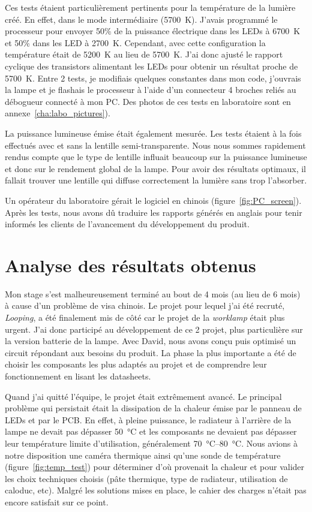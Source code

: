 \documentclass[a4paper, 12pt, sffamily]{report}
\begin{document}
Ces tests étaient particulièrement pertinents pour la température de la lumière créé. En effet, dans le mode intermédiaire (\SI{5700}{\kelvin}). J'avais programmé le processeur pour envoyer 50\% de la puissance électrique dans les LEDs à \SI{6700}{\kelvin} et 50\% dans les LED à \SI{2700}{\kelvin}. Cependant, avec cette configuration la température était de \SI{5200}{\kelvin} au lieu de \SI{5700}{\kelvin}. J'ai donc ajusté le rapport cyclique des transistors alimentant les LEDs pour obtenir un résultat proche de \SI{5700}{\kelvin}. Entre 2 tests, je modifiais quelques constantes dans mon code, j'ouvrais la lampe et je flashais le processeur à l'aide d'un connecteur 4 broches reliés au débogueur connecté à mon PC. Des photos de ces tests en laboratoire sont en annexe~\ref{cha:labo_pictures}).

La puissance lumineuse émise était également mesurée. Les tests étaient à la fois effectués avec et sans la lentille semi-transparente. Nous nous sommes rapidement rendus compte que le type de lentille influait beaucoup sur la puissance lumineuse et donc sur le rendement global de la lampe. Pour avoir des résultats optimaux, il fallait trouver une lentille qui diffuse correctement la lumière sans trop l'absorber.

Un opérateur du laboratoire gérait le logiciel en chinois (figure~\ref{fig:PC_screen}). Après les tests, nous avons dû traduire les rapports générés en anglais pour tenir informés les clients de l'avancement du développement du produit.  


\chapter{Analyse des résultats obtenus}

Mon stage s'est malheureusement terminé au bout de 4 mois (au lieu de 6 mois) à cause d'un problème de visa chinois. Le projet pour lequel j'ai été recruté, \emph{Looping}, a été finalement mis de côté car le projet de la \emph{worklamp} était plus urgent. J'ai donc participé au développement de ce 2\ieme{} projet, plus particulière sur la version batterie de la lampe. Avec David, nous avons conçu puis optimisé un circuit répondant aux besoins du produit. La phase la plus importante a été de choisir les composants les plus adaptés au projet et de comprendre leur fonctionnement en lisant les datasheets.

Quand j'ai quitté l'équipe, le projet était extrêmement avancé. Le principal problème qui persistait était la dissipation de la chaleur émise par le panneau de LEDs et par le PCB. En effet, à pleine puissance, le radiateur à l'arrière de la lampe ne devait pas dépasser \SI{50}{\celsius} et les composants ne devaient pas dépasser leur température limite d'utilisation, généralement \SIrange{70}{80}{\celsius}. Nous avions à notre disposition une caméra thermique ainsi qu'une sonde de température (figure~\ref{fig:temp_test}) pour déterminer d'où provenait la chaleur et pour valider les choix techniques choisis (pâte thermique, type de radiateur, utilisation de caloduc, etc). Malgré les solutions mises en place, le cahier des charges n'était pas encore satisfait sur ce point.
\end{document}
